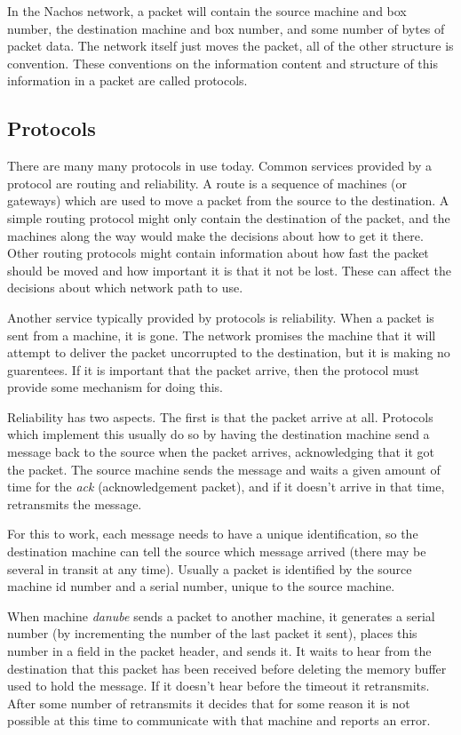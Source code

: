 In the Nachos network, a packet will contain the source machine and box number,
the destination machine and box number, and some number of bytes of packet
data.
The network itself just moves the packet, all of the other structure
is convention.  These conventions on the information content and structure
of this information in a packet are called protocols.

\subsection{Protocols}

There are many many protocols in use today.  Common services provided by
a protocol are routing and reliability.  A route is a sequence of machines
(or gateways) which are used to move a packet from the source to the
destination.  A simple routing protocol might only contain the destination
of the packet, and the machines along the way would make the decisions about
how to get it there.  Other routing protocols might contain information about
how fast the packet should be moved and how important it is that it not be
lost.  These can affect the decisions about which network path to use.

Another service typically provided by protocols is reliability.  When a
packet is sent from a machine, it is gone.  The network promises the
machine that it will attempt to deliver the packet uncorrupted to the
destination, but it is making no guarentees.  If it is important that the
packet arrive, then the protocol must provide some mechanism for
doing this.

Reliability has two aspects.  The first is that the packet arrive at all.
Protocols which implement this usually do so by having the destination machine
send a message back to the source when the packet arrives, acknowledging that
it got the packet.  The source machine sends the message and waits a given
amount of time for the {\it ack} (acknowledgement packet), and if it doesn't
arrive in that time, retransmits the message.

For this to work, each message needs to have a unique identification, so the
destination machine can tell the source which message arrived (there may
be several in transit at any time).  Usually a packet is identified by
the source machine id number and a serial number, unique to the source machine.

When machine {\it danube} sends a packet to another machine, it generates
a serial number (by incrementing the number of the last packet it sent),
places this number in a field in the packet header, and sends it.  It waits
to hear from the destination that this packet has been received before 
deleting the memory buffer used to hold the message.  If it doesn't hear
before the timeout it retransmits.  After some number of retransmits it
decides that for some reason it is not possible at this time to communicate
with that machine and reports an error.

